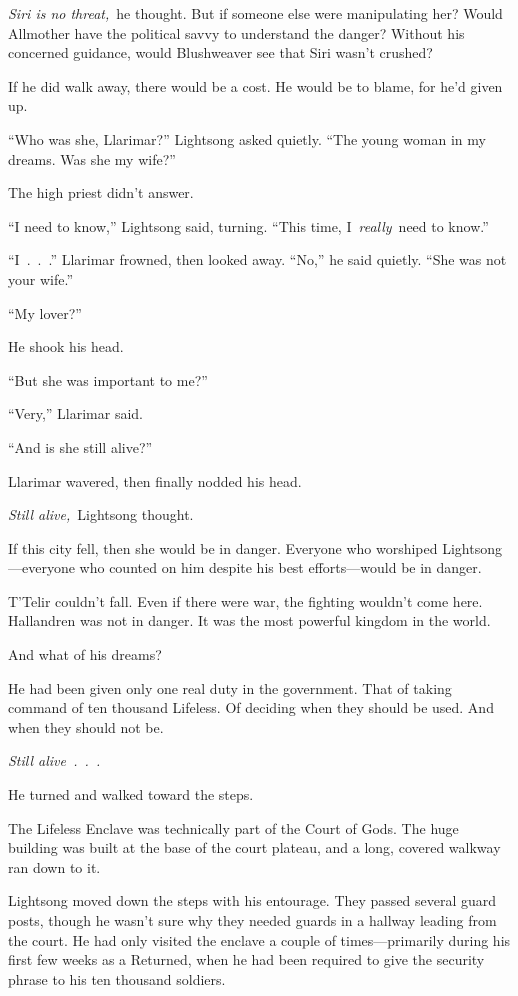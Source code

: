 \textit{Siri is no threat,}~he thought. But if someone else were manipulating her? Would Allmother have the political savvy to understand the danger? Without his concerned guidance, would Blushweaver see that Siri wasn’t crushed?

If he did walk away, there would be a cost. He would be to blame, for he’d given up.

“Who was she, Llarimar?” Lightsong asked quietly. “The young woman in my dreams. Was she my wife?”

The high priest didn’t answer.

“I need to know,” Lightsong said, turning. “This time, I~\textit{really}~need to know.”

“I~.~.~.” Llarimar frowned, then looked away. “No,” he said quietly. “She was not your wife.”

“My lover?”

He shook his head.

“But she was important to me?”

“Very,” Llarimar said.

“And is she still alive?”

Llarimar wavered, then finally nodded his head.

\textit{Still alive,}~Lightsong thought.

If this city fell, then she would be in danger. Everyone who worshiped Lightsong—everyone who counted on him despite his best efforts—would be in danger.

T’Telir couldn’t fall. Even if there were war, the fighting wouldn’t come here. Hallandren was not in danger. It was the most powerful kingdom in the world.

And what of his dreams?

He had been given only one real duty in the government. That of taking command of ten thousand Lifeless. Of deciding when they should be used. And when they should not be.

\textit{Still alive~.~.~.}

He turned and walked toward the steps.

\orn

The Lifeless Enclave was technically part of the Court of Gods. The huge building was built at the base of the court plateau, and a long, covered walkway ran down to it.

Lightsong moved down the steps with his entourage. They passed several guard posts, though he wasn’t sure why they needed guards in a hallway leading from the court. He had only visited the enclave a couple of times—primarily during his first few weeks as a Returned, when he had been required to give the security phrase to his ten thousand soldiers.

